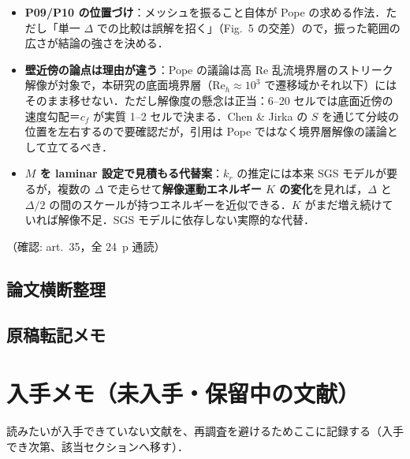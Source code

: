 \documentclass[11pt]{jsarticle}
\let\litsectionorig\section
\renewcommand{\section}{\clearpage\litsectionorig}
\begin{document}
\begin{itemize}
\begin{itemize}
    \item \textbf{P09/P10 の位置づけ}：メッシュを振ること自体が Pope の求める作法．ただし「単一 $\Delta$ での比較は誤解を招く」（Fig.~5 の交差）ので，振った範囲の広さが結論の強さを決める．
    \item \textbf{壁近傍の論点は理由が違う}：Pope の議論は高 Re 乱流境界層のストリーク解像が対象で，本研究の底面境界層（$\mathrm{Re}_h \approx 10^3$ で遷移域かそれ以下）にはそのまま移せない．ただし解像度の懸念は正当：6--20 セルでは底面近傍の速度勾配＝$c_f$ が実質 1--2 セルで決まる．Chen \& Jirka の $S$ を通じて分岐の位置を左右するので要確認だが，引用は Pope ではなく境界層解像の議論として立てるべき．
    \item \textbf{$M$ を laminar 設定で見積もる代替案}：$k_r$ の推定には本来 SGS モデルが要るが，複数の $\Delta$ で走らせて\textbf{解像運動エネルギー $K$ の変化}を見れば，$\Delta$ と $\Delta/2$ の間のスケールが持つエネルギーを近似できる．$K$ がまだ増え続けていれば解像不足．SGS モデルに依存しない実際的な代替．
  \end{itemize}
\end{itemize}
\noindent（確認: art.\ 35，全 24~p 通読）

\subsection*{論文横断整理}

\subsection*{原稿転記メモ}

\section{入手メモ（未入手・保留中の文献）}

\noindent 読みたいが入手できていない文献を、再調査を避けるためここに記録する（入手でき次第、該当セクションへ移す）．
\end{document}
